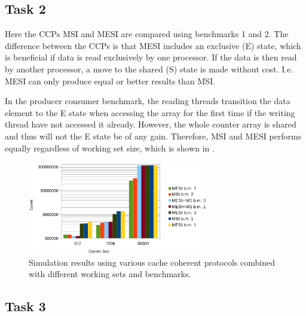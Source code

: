 \subsection{Task 2}
\label{sec:lab12}
Here the CCPs MSI and MESI are compared using benchmarks 1 and 2. The difference between the CCPs is that MESI includes an exclusive (E) state, which is beneficial if data is read exclusively by one processor. If the data is then read by another processor, a move to the shared (S) state is made without cost. I.e. MESI can only produce equal or better results than MSI.

In the producer consumer benchmark, the reading threads transition the data element to the E state when accessing the array for the first time if the writing thread have not accessed it already. However, the whole counter array is shared and thus will not the E state be of any gain. Therefore, MSI and MESI performs equally regardless of working set size, which is shown in .


\begin{figure}[t]
	\center
	\includegraphics[width=0.7\textwidth]{bars}
	\caption{Simulation results using various cache coherent protocols combined with different working sets and benchmarks.}
	\label{fig:resultslab1}
\end{figure}

\subsection{Task 3}
\label{sec:lab13}
